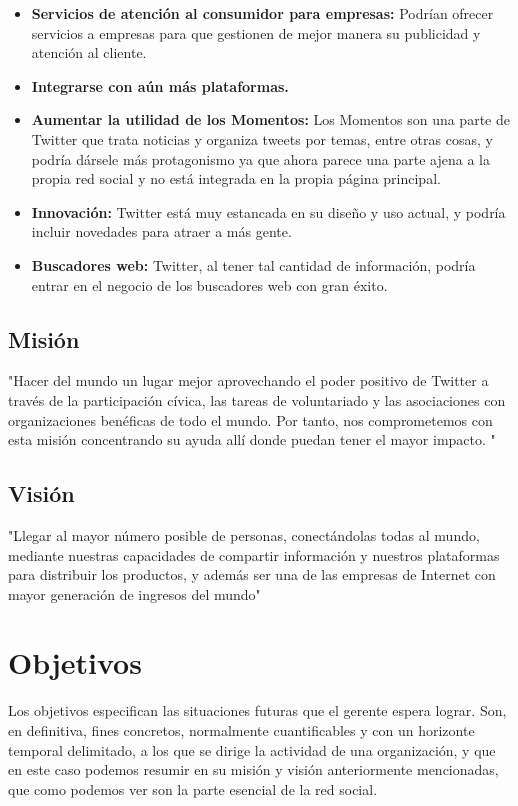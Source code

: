 \begin{itemize}

\item \textbf{Servicios de atención al consumidor para empresas:} Podrían ofrecer servicios a empresas para que gestionen de mejor manera su publicidad y atención al cliente.
\item \textbf{Integrarse con aún más plataformas.}
\item \textbf{Aumentar la utilidad de los Momentos:} Los Momentos son una parte de Twitter que trata noticias y organiza tweets por temas, entre otras cosas, y podría dársele más protagonismo ya que ahora parece una parte ajena a la propia red social y no está integrada en la propia página principal.
\item \textbf{Innovación:} Twitter está muy estancada en su diseño y uso actual, y podría incluir novedades para atraer a más gente.
\item \textbf{Buscadores web:} Twitter, al tener tal cantidad de información, podría entrar en el negocio de los buscadores web con gran éxito.

\end{itemize}

\subsection{Misión}

"Hacer del mundo un lugar mejor aprovechando el poder positivo de Twitter a través de la participación cívica, las tareas de voluntariado y las asociaciones con organizaciones benéficas de todo el mundo. Por tanto, nos comprometemos con esta misión concentrando su ayuda allí donde puedan tener el mayor impacto. "

\subsection{Visión}

"Llegar al mayor número posible de personas, conectándolas todas al mundo, mediante nuestras capacidades de compartir información y nuestros plataformas para distribuir los productos, y además ser una de las empresas de Internet con mayor generación de ingresos del mundo"

\section{Objetivos}

Los objetivos especifican las situaciones futuras que el gerente espera lograr. Son, en definitiva, fines concretos, normalmente cuantificables y con un horizonte temporal delimitado, a los que se dirige la actividad de una organización, y que en este caso podemos resumir en su misión y visión anteriormente mencionadas, que como podemos ver son la parte esencial de la red social.

